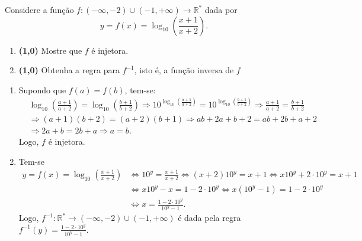 \documentclass[12pt,a4paper]{article}
\newcommand*\R{\mathbb{R}}
\begin{document}
\begin{ExerciseList}
\Exercise%
Considere a função $f:
(-\infty, -2) \cup (-1, +\infty)
\to \R^*$ dada por
\[
y = f(x) = \log_{10}\left( \frac{x+1}{x+2} \right).
\]
\begin{enumerate}
\item \textbf{(1,0)} Mostre que $f$ é injetora.
\item \textbf{(1,0)} Obtenha a regra para $f^{-1}$, isto é, a função inversa de $f$
\end{enumerate}
\Answer
\begin{enumerate}
\item Supondo que $f(a) = f(b)$, tem-se:
\begin{align*}
& \log_{10}\left( \frac{a+1}{a+2} \right) = \log_{10}\left( \frac{b+1}{b+2} \right)
\Rightarrow
10^{\log_{10}\left( \frac{a+1}{a+2} \right)} = 10^{\log_{10}\left( \frac{b+1}{b+2} \right)}
\Rightarrow
\frac{a+1}{a+2} = \frac{b+1}{b+2}\\
& \Rightarrow
(a+1)(b+2) = (a+2)(b+1)
\Rightarrow
ab+2a+b+2 = ab+2b+a+2\\
& \Rightarrow
2a+b = 2b+a
\Rightarrow
a = b.
\end{align*}
Logo, $f$ é injetora.

\item Tem-se
\begin{align*}
y = f(x) = \log_{10}\left( \frac{x+1}{x+2} \right)
& \Leftrightarrow
10^y = \frac{x+1}{x+2}
\Leftrightarrow
(x + 2) 10^y = x+1
\Leftrightarrow
x10^y + 2 \cdot 10^y = x+1 \\
& \Leftrightarrow
x 10^y - x = 1 - 2 \cdot 10^y
 \Leftrightarrow
x(10^y-1) = 1 - 2 \cdot 10^y\\
& \Leftrightarrow
x = \frac{1 - 2 \cdot 10^y}{10^y-1}.
\end{align*}
Logo, $f^{-1}: \R^* \to (-\infty, -2) \cup (-1, +\infty)$ é dada pela regra $f^{-1}(y) = \frac{1 - 2 \cdot 10^y}{10^y-1}$.
\end{enumerate}


\end{ExerciseList}
\end{document}
